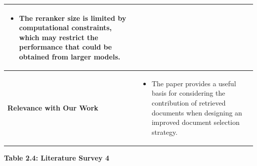\documentclass[12pt,a4paper]{report}
\begin{document}
\begin{longtable}{|p{1.25in}|p{5.15in}|}
\begin{itemize}[
    leftmargin=0.18in,
    itemsep=0.05in,
    topsep=0pt,
    parsep=0pt
]
    \item The reranker size is limited by computational constraints, which may restrict the performance that could be obtained from larger models.
\end{itemize}
\\ \hline

\textbf{Relevance with Our Work} &
\begin{itemize}[
    leftmargin=0.18in,
    itemsep=0.05in,
    topsep=0pt,
    parsep=0pt
]
    \item The paper provides a useful basis for considering the contribution of retrieved documents when designing an improved document selection strategy.
\end{itemize}
\\ \hline

\end{longtable}

\clearpage



\begin{center}
\textbf{Table 2.4: Literature Survey 4}
\end{center}
\end{document}
